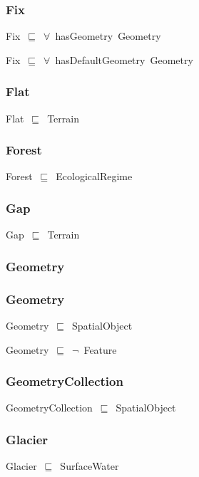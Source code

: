 \documentclass{article}
\begin{document}
\subsubsection*{Fix}

Fix~\ensuremath{\sqsubseteq}~\ensuremath{\forall}~hasGeometry~Geometry~

Fix~\ensuremath{\sqsubseteq}~\ensuremath{\forall}~hasDefaultGeometry~Geometry~

\subsubsection*{Flat}

Flat~\ensuremath{\sqsubseteq}~Terrain~

\subsubsection*{Forest}

Forest~\ensuremath{\sqsubseteq}~EcologicalRegime~

\subsubsection*{Gap}

Gap~\ensuremath{\sqsubseteq}~Terrain~

\subsubsection*{Geometry}

\subsubsection*{Geometry}

Geometry~\ensuremath{\sqsubseteq}~SpatialObject~

Geometry~\ensuremath{\sqsubseteq}~\ensuremath{\lnot}~Feature

\subsubsection*{GeometryCollection}

GeometryCollection~\ensuremath{\sqsubseteq}~SpatialObject~

\subsubsection*{Glacier}

Glacier~\ensuremath{\sqsubseteq}~SurfaceWater~
\end{document}
